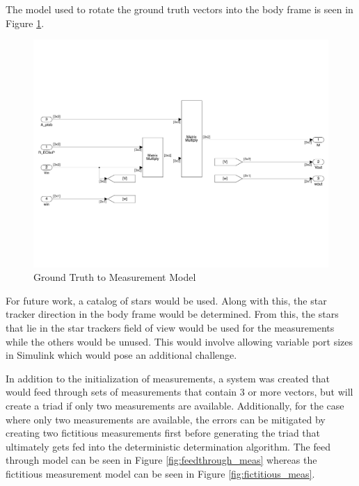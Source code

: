 The model used to rotate the ground truth vectors into the body frame is seen in Figure \ref{fig:ground_truth_to_meas}.

\begin{figure}[H]
    \centering
    \captionsetup{ justification = centering }
    \includegraphics[trim={0.25cm 3cm 0.25cm 3cm},clip,width = 15cm]{Images/PS6/ground_truth_to_meas.png}
    \caption{Ground Truth to Measurement Model}
    \label{fig:ground_truth_to_meas}
\end{figure}

For future work, a catalog of stars would be used. Along with this, the star tracker direction in the body frame would be determined. From this, the stars that lie in the star trackers field of view would be used for the measurements while the others would be unused. This would involve allowing variable port sizes in Simulink which would pose an additional challenge.

In addition to the initialization of measurements, a system was created that would feed through sets of measurements that contain 3 or more vectors, but will create a triad if only two measurements are available. Additionally, for the case where only two measurements are available, the errors can be mitigated by creating two fictitious measurements first before generating the triad that ultimately gets fed into the deterministic determination algorithm. The feed through model can be seen in Figure \ref{fig:feedthrough_meas} whereas the fictitious measurement model can be seen in Figure \ref{fig:fictitious_meas}.

